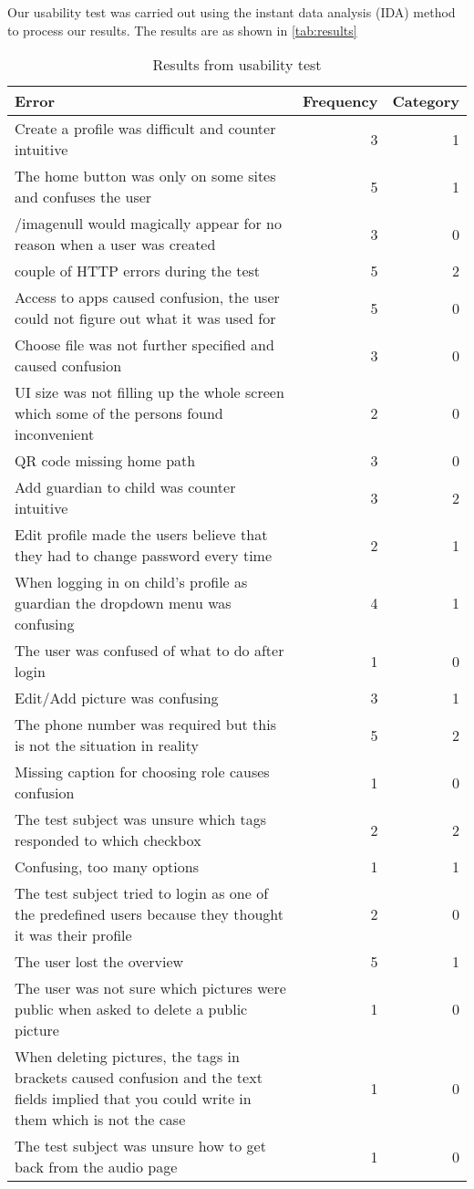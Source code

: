 Our usability test was carried out using the instant data analysis (IDA) method to process our results. The results are as shown in \autoref{tab:results}

\begin{table}[H]
	\scriptsize
	\centering
	\begin{tabular}{|p{7cm}|r|r|}
		\hline
		Error & Frequency & Category \\
		\hline
		\hline
		Create a profile was difficult and counter intuitive & 3 & 1 \\ \hline
		The home button was only on some sites and confuses the user & 5 & 1 \\ \hline
		/imagenull would magically appear for no reason when a user was created & 3 & 0 \\ \hline
		couple of HTTP errors during the test & 5 & 2 \\ \hline
		Access to apps caused confusion, the user could not figure out what it was used for & 5 & 0 \\ \hline
		Choose file was not further specified and caused confusion & 3 & 0 \\ \hline
		UI size was not filling up the whole screen which some of the persons found inconvenient & 2 & 0 \\ \hline
		QR code missing home path & 3 & 0 \\ \hline
		Add guardian to child was counter intuitive & 3 & 2 \\ \hline
		Edit profile made the users believe that they had to change password every time & 2 & 1 \\ \hline
		When logging in on child's profile as guardian the dropdown menu was confusing & 4 & 1 \\ \hline
		The user was confused of what to do after login & 1 & 0 \\ \hline
		Edit/Add picture was confusing & 3 & 1 \\ \hline
		The phone number was required but this is not the situation in reality & 5 & 2 \\ \hline
		Missing caption for choosing role causes confusion & 1 & 0 \\ \hline
		The test subject was unsure which tags responded to which checkbox & 2 & 2 \\ \hline
		Confusing, too many options & 1 & 1 \\ \hline
		The test subject tried to login as one of the predefined users because they thought it was their profile & 2 & 0 \\ \hline
		The user lost the overview & 5 & 1 \\ \hline
		The user was not sure which pictures were public when asked to delete a public picture & 1 & 0 \\ \hline
		When deleting pictures, the tags in brackets caused confusion and the text fields implied that you could write in them which is not the case & 1 & 0 \\ \hline
		The test subject was unsure how to get back from the audio page & 1 & 0 \\
		\hline
	\end{tabular}
	\caption{Results from usability test}
	\label{tab:results}
\end{table}

